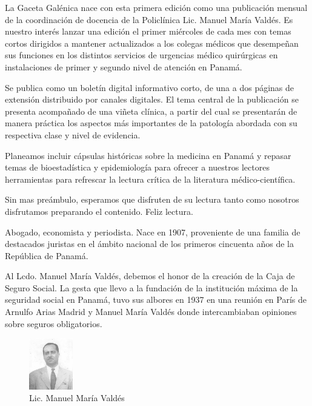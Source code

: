 \documentclass[a4paper]{article}
\date{\today}
\let\cite=\supercite %
\begin{document}
\maketitle

\begin{multicols}{3}



La Gaceta Galénica nace con esta primera edición como una publicación mensual de la coordinación de docencia de la Policlínica Lic. Manuel María Valdés. Es nuestro interés lanzar una edición el primer miércoles de cada mes con temas cortos dirigidos a mantener actualizados a los colegas médicos que desempeñan sus funciones en los distintos servicios de urgencias médico quirúrgicas en instalaciones de primer y segundo nivel de atención en Panamá.

Se publica como un boletín digital informativo corto, de una a dos páginas de extensión distribuido por canales digitales. El tema central de la publicación se presenta acompañado de una viñeta clínica, a partir del cual se presentarán de manera práctica los aspectos más importantes de la patología abordada con su respectiva clase y nivel de evidencia.

Planeamos incluir cápsulas históricas sobre la medicina en Panamá y repasar temas de bioestadística y epidemiología para ofrecer a nuestros lectores herramientas para refrescar la lectura crítica de la literatura médico-científica.

Sin mas preámbulo, esperamos que disfruten de su lectura tanto como nosotros disfrutamos preparando el contenido. Feliz lectura.

\closearticle



Abogado, economista y periodista. Nace en 1907, proveniente de una familia de destacados juristas en el ámbito nacional de los primeros cincuenta años de la República de Panamá.

Al Lcdo. Manuel María Valdés, debemos el honor de la creación de la Caja de Seguro Social. La gesta que llevo a la fundación de la institución máxima de la seguridad social en Panamá, tuvo sus albores en 1937 en una reunión en París de Arnulfo Arias Madrid y Manuel María Valdés donde intercambiaban opiniones sobre seguros obligatorios\cite{Pinock95}.

\begin{figure}
	\begin{center}
		\vspace{-25pt}
		\includegraphics[width=0.17\textwidth]{mmvaldes.jpg}
	\end{center}
	\caption*{Lic. Manuel María Valdés}
\end{figure}


\end{multicols}
\end{document}
